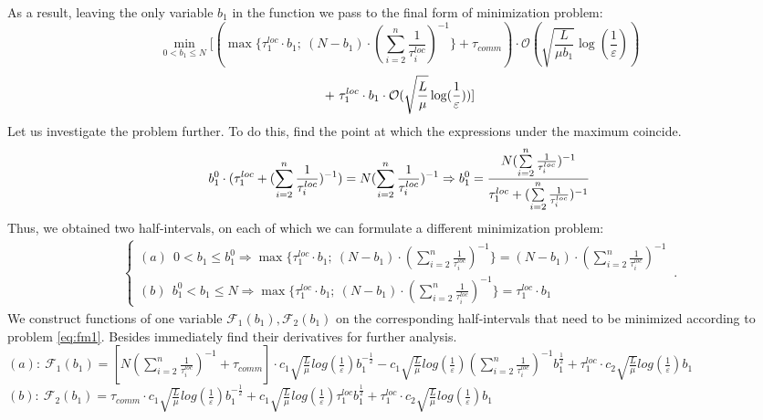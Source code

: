 \documentclass{article}
\begin{document}
As a result, leaving the only variable $b_1$ in the function we pass to the final form of minimization problem:
\\
\begin{equation}
    \label{eq:fm1}
      \underset{0 < b_1 \leq N}{\min}[(\max\{\tau_1^{loc}\cdot b_1; ~(N-b_1) \cdot (\sum\limits_{i = 2}^{n} \frac{1}{\tau_i^{loc}} )^{-1}\} + \tau_{comm}) \cdot \mathcal O(\sqrt{\frac{L}{\mu b_1}}\log(\frac{1}{\varepsilon}))
\end{equation}
\begin{equation}
     \notag
     + ~
    \tau_1^{loc}\cdot b_1 \cdot \mathcal O(\sqrt{\frac{L}{\mu}}\log(\frac{1}{\varepsilon}))] 
\end{equation}
Let us investigate the problem further. To do this, find the point at which the expressions under the maximum coincide. 
\begin{equation}
    \notag
    b_1^0 \cdot (\tau_1^{loc} + (\sum\limits_{i = 2}^{n} \frac{1}{\tau_i^{loc}})^{-1}) = N (\sum\limits_{i = 2}^{n} \frac{1}{\tau_i^{loc}})^{-1} \Rightarrow b_1^0 = \frac{N (\sum\limits_{i = 2}^{n} \frac{1}{\tau_i^{loc}})^{-1}}{\tau_1^{loc} + (\sum\limits_{i = 2}^{n} \frac{1}{\tau_i^{loc}})^{-1}}
\end{equation}
Thus, we obtained two half-intervals, on each of which we can formulate a different minimization problem:
\begin{eqnarray}
\label{half-int}
    \begin{cases}
    (a) ~ ~ 0 < b_1 \leq b_1^0 \Rightarrow \max\{\tau_1^{loc}\cdot b_1; ~(N-b_1) \cdot (\sum\limits_{i = 2}^{n} \frac{1}{\tau_i^{loc}} )^{-1}\} = 
    (N-b_1) \cdot (\sum\limits_{i = 2}^{n} \frac{1}{\tau_i^{loc}})^{-1}
    \\
    (b) ~ ~ b_1^0 <  b_1 \leq N \Rightarrow \max\{\tau_1^{loc}\cdot b_1; ~(N-b_1) \cdot (\sum\limits_{i = 2}^{n} \frac{1}{\tau_i^{loc}} )^{-1}\} = \tau_1^{loc}\cdot b_1
    \end{cases}\,.
\end{eqnarray}
We construct functions of one variable $\mathcal{F}_1(b_1), \mathcal{F}_2(b_1)$ on the corresponding half-intervals that need to be minimized according to problem \eqref{eq:fm1}. Besides immediately find their derivatives for further analysis.\\
$(a): ~\mathcal{F}_1(b_1) = [N (\sum\limits_{i = 2}^{n} \frac{1}{\tau_i^{loc}})^{-1} + \tau_{comm}]\cdot 
c_1 \sqrt{\frac{L}{\mu}}log (\frac{1}{\varepsilon})  b_1^{-\frac{1}{2}} - 
c_1  \sqrt{\frac{L}{\mu}}log (\frac{1}{\varepsilon})(\sum\limits_{i =
2}^{n} \frac{1}{\tau_i^{loc}})^{-1} b_1^{\frac{1}{2}}  + \tau_1^{loc}\cdot c_2  \sqrt{\frac{L}{\mu}}log (\frac{1}{\varepsilon}) b_1 $\\
$(b): ~\mathcal{F}_2(b_1) = \tau_{comm}\cdot 
c_1 \sqrt{\frac{L}{\mu}}log (\frac{1}{\varepsilon})  b_1^{-\frac{1}{2}} + 
c_1  \sqrt{\frac{L}{\mu}}log (\frac{1}{\varepsilon})\tau_1^{loc} b_1^{\frac{1}{2}}  + \tau_1^{loc}\cdot c_2  \sqrt{\frac{L}{\mu}}log (\frac{1}{\varepsilon}) b_1 $\\
\end{document}
